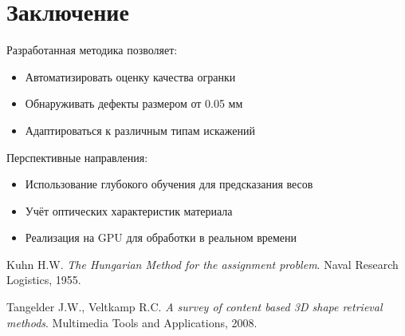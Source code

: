 \documentclass[a4paper,14pt]{extarticle}
\begin{document}
\section{Заключение}
Разработанная методика позволяет:
\begin{itemize}
    \item Автоматизировать оценку качества огранки
    \item Обнаруживать дефекты размером от 0.05 мм
    \item Адаптироваться к различным типам искажений
\end{itemize}

Перспективные направления:
\begin{itemize}
    \item Использование глубокого обучения для предсказания весов
    \item Учёт оптических характеристик материала
    \item Реализация на GPU для обработки в реальном времени
\end{itemize}

\begin{thebibliography}{9}
Kuhn H.W. 
\textit{The Hungarian Method for the assignment problem}. 
Naval Research Logistics, 1955.

Tangelder J.W., Veltkamp R.C. 
\textit{A survey of content based 3D shape retrieval methods}. 
Multimedia Tools and Applications, 2008.
\end{thebibliography}
\end{document}
